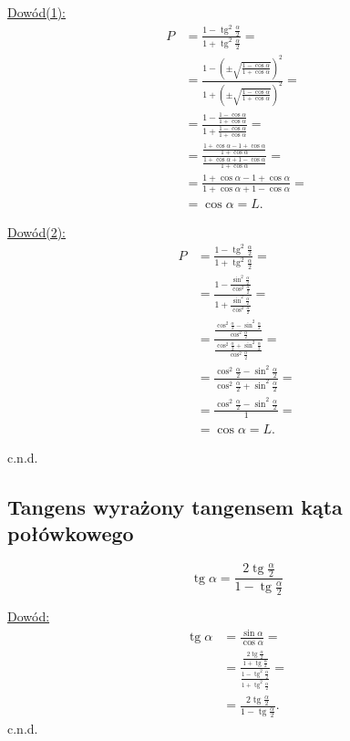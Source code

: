 \documentclass[12pt,a4paper,fleqn]{article}
\DeclareMathOperator{\tg}{tg}
\begin{document}
		\underline{Dowód(1):} \noindent
		\begin{align*}
			P &= \frac{1-\tg^2\frac{\alpha}{2}}{1+\tg^2\frac{\alpha}{2}} = \\
				&=\frac{1-(\pm\sqrt{\frac{1-\cos\alpha}{1+\cos\alpha}})^2}{1+(\pm\sqrt{\frac{1-\cos\alpha}{1+\cos\alpha}})^2} =\\
				&=\frac{1-\frac{1-\cos\alpha}{1+\cos\alpha}}{1+\frac{1-\cos\alpha}{1+\cos\alpha}} =\\
				&=\frac{\frac{1+\cos\alpha-1+\cos\alpha}{1+\cos\alpha}}{\frac{1+\cos\alpha+1-\cos\alpha}{1+\cos\alpha}} =\\
			&=\frac{1+\cos\alpha-1+\cos\alpha}{1+\cos\alpha+1-\cos\alpha} =\\
			&= \cos\alpha = L.
		\end{align*}
		
		\underline{Dowód(2):} \noindent
		\begin{align*}
			P &= \frac{1-\tg^2\frac{\alpha}{2}}{1+\tg^2\frac{\alpha}{2}} = \\
  			  &= \frac{1-\frac{\sin^2\frac{\alpha}{2}}{\cos^2\frac{\alpha}{2}}}{1+\frac{\sin^2\frac{\alpha}{2}}{\cos^2\frac{\alpha}{2}}}=\\
  			  &= \frac{\frac{\cos^2\frac{\alpha}{2}-\sin^2\frac{\alpha}{2}}{\cos^2\frac{\alpha}{2}}}{\frac{\cos^2\frac{\alpha}{2}+\sin^2\frac{\alpha}{2}}{\cos^2\frac{\alpha}{2}}}=\\
  			  &= \frac{\cos^2\frac{\alpha}{2}-\sin^2\frac{\alpha}{2}}{\cos^2\frac{\alpha}{2}+\sin^2\frac{\alpha}{2}}=\\
  			  &= \frac{\cos^2\frac{\alpha}{2}-\sin^2\frac{\alpha}{2}}{1}=\\
  			  &= \cos\alpha = L.
		\end{align*}
		
		c.n.d.
	\subsection{Tangens wyrażony tangensem kąta połówkowego}
		\begin{equation*}
			\tg\alpha = \frac{2\tg\frac{\alpha}{2}}{1-\tg\frac{\alpha}{2}}
		\end{equation*}
		
		\underline{Dowód:} \noindent
		\begin{align*}
			\tg\alpha &= \frac{\sin\alpha}{\cos\alpha} = \\
					  &= \frac{\frac{2\tg\frac{\alpha}{2}}{1+\tg\frac{\alpha}{2}}}{\frac{1-\tg^2\frac{\alpha}{2}}{1+\tg^2\frac{\alpha}{2}}} =\\
					  &=\frac{2\tg\frac{\alpha}{2}}{1-\tg\frac{\alpha}{2}}.
		\end{align*}
		c.n.d.
\end{document}
